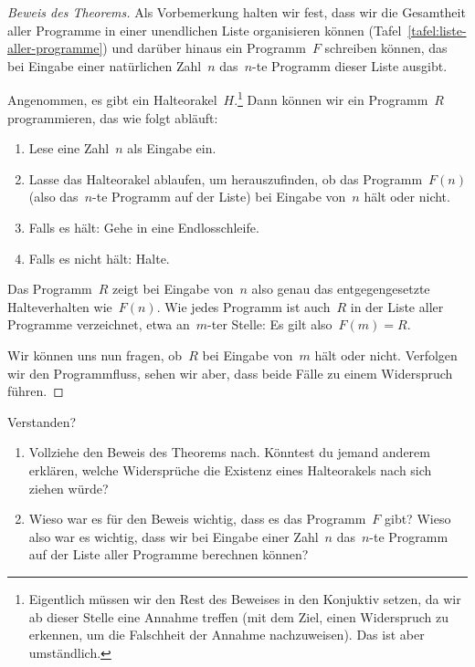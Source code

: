 \documentclass[twoside]{../zirkelblatt1415}
\theoremstyle{definition}
\theoremstyle{plain}
\theoremstyle{remark}
\newenvironment{listing}{
  \renewcommand*\theenumi{\arabic{enumi}}
  \renewcommand{\labelenumi}{\theenumi.}
  \begin{enumerate}\itemsep0em}{\end{enumerate}}
\begin{document}
\begin{proof}[Beweis des Theorems]Als Vorbemerkung halten wir fest, dass wir
die Gesamtheit aller Programme in einer unendlichen Liste organisieren können
(Tafel~\ref{tafel:liste-aller-programme}) und darüber hinaus ein Programm~$F$
schreiben können, das bei Eingabe einer natürlichen Zahl~$n$ das~$n$-te
Programm dieser Liste ausgibt.

Angenommen, es gibt ein Halteorakel~$H$.\footnote{Eigentlich müssen wir den
Rest des Beweises in den Konjuktiv setzen, da wir ab dieser Stelle eine Annahme
treffen (mit dem Ziel, einen Widerspruch zu erkennen, um die Falschheit
der Annahme nachzuweisen). Das ist aber umständlich.}
Dann können wir ein Programm~$R$
programmieren, das wie folgt abläuft:
\begin{listing}
\item Lese eine Zahl~$n$ als Eingabe ein.
\item Lasse das Halteorakel ablaufen, um herauszufinden, ob das
Programm~$F(n)$ (also das~$n$-te Programm auf der Liste) bei Eingabe von~$n$
hält oder nicht.
\item Falls es hält: Gehe in eine Endlosschleife.
\item Falls es nicht hält: Halte.
\end{listing}
Das Programm~$R$ zeigt bei Eingabe von~$n$ also genau das entgegengesetzte
Halteverhalten wie~$F(n)$. Wie jedes Programm ist auch~$R$ in der Liste aller
Programme verzeichnet, etwa an~$m$-ter Stelle: Es gilt also~$F(m) = R$.

Wir können uns nun fragen, ob~$R$ bei Eingabe von~$m$ hält oder nicht. Verfolgen
wir den Programmfluss, sehen wir aber, dass beide Fälle zu einem Widerspruch
führen.
\end{proof}

\begin{aufgabeShaded}{Verstanden?}
\begin{enumerate}
\item Vollziehe den Beweis des Theorems nach. Könntest du jemand anderem
erklären, welche Widersprüche die Existenz eines Halteorakels nach sich ziehen
würde?
\item Wieso war es für den Beweis wichtig, dass es das Programm~$F$ gibt? Wieso
also war es wichtig, dass wir bei Eingabe einer Zahl~$n$ das~$n$-te Programm
auf der Liste aller Programme berechnen können?
\end{enumerate}
\vspace{-1em}
\end{aufgabeShaded}
\end{document}
